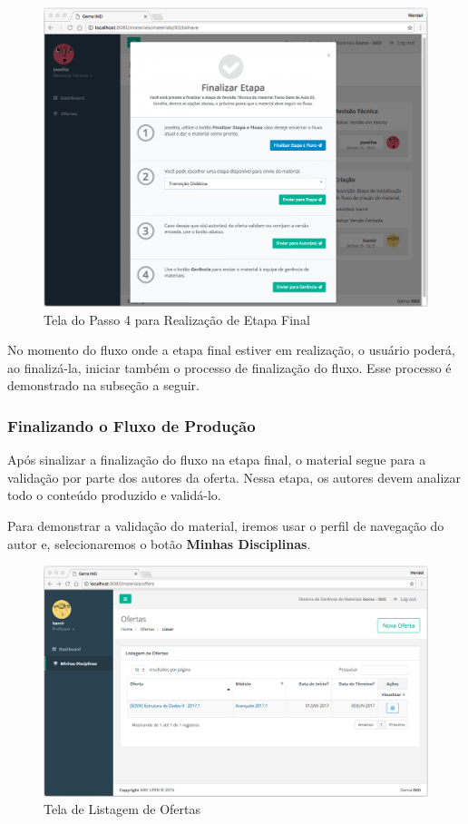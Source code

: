 \begin{figure}[H]
\centering
     \includegraphics[width=1.0\textwidth]{Screens/BehaveMaterial5.png}
      \caption{Tela do Passo 4 para Realização de Etapa Final}
       \label{fig:BehaveMaterial5}
\end{figure} 

No momento do fluxo onde a etapa final estiver em realização, o usuário poderá, ao finalizá-la, iniciar também o processo de finalização do fluxo. Esse processo é demonstrado na subseção a seguir.

\subsubsection{Finalizando o Fluxo de Produção}

Após sinalizar a finalização do fluxo na etapa final, o material segue para a validação por parte dos autores da oferta. Nessa etapa, os autores devem analizar todo o conteúdo produzido e validá-lo.

Para demonstrar a validação do material, iremos usar o perfil de navegação do autor e, selecionaremos o botão \textbf{Minhas Disciplinas}.

\begin{figure}[H]
\centering
     \includegraphics[width=1.0\textwidth]{Screens/OffersList.png}
      \caption{Tela de Listagem de Ofertas}
       \label{fig:OffersList}
\end{figure} 

